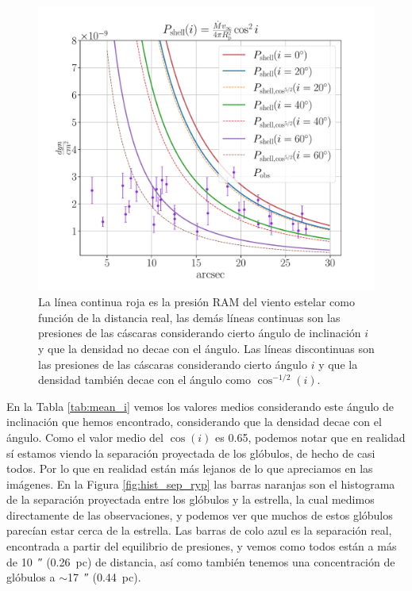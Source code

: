 \documentclass{book}
\begin{document}
\begin{figure}[htb]
    \centering
    \includegraphics[width=\textwidth]{imagenes_corregidas/S_2.pdf}
    \caption{La línea continua roja es la presión RAM del viento
      estelar como función de la distancia real, las demás líneas
      continuas son las presiones de las cáscaras considerando cierto
      ángulo de inclinación $i$ y que la densidad no decae con el
      ángulo. Las líneas discontinuas son las presiones de las
      cáscaras considerando cierto ángulo $i$ y que la densidad
      también decae con el ángulo como $\cos^{-1/2}(i)$.}
    \label{fig:ncos_2}
\end{figure}

En la Tabla \ref{tab:mean_i} vemos los valores medios considerando
este ángulo de inclinación que hemos encontrado, considerando que la
densidad decae con el ángulo. Como el valor medio del $\cos(i)$ es
0.65, podemos notar que en realidad sí estamos viendo la separación
proyectada de los glóbulos, de hecho de casi todos. Por lo que en
realidad están más lejanos de lo que apreciamos en las imágenes. En la
Figura \ref{fig:hist_sep_ryp} las barras naranjas son el histograma de
la separación proyectada entre los glóbulos y la estrella, la cual
medimos directamente de las observaciones, y podemos ver que muchos de
estos glóbulos parecían estar cerca de la estrella. Las barras de colo
azul es la separación real, encontrada a partir del equilibrio de
presiones, y vemos como todos están a más de \SI{10}{\arcsecond}
(\SI{0.26}{pc}) de distancia, así como también tenemos una
concentración de glóbulos a $\sim$\SI{17}{\arcsecond} (\SI{0.44}{pc}).
\end{document}
